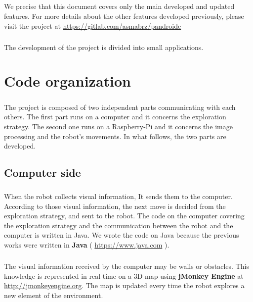 \documentclass[12pt]{report}
\begin{document}
\paragraph{}
We precise that this document covers only the main developed and updated features. For more details about the other features developed previously, please visit the project at \url{https://gitlab.com/asmabrz/pandroide}

\paragraph{}
The development of the project is divided into small applications. 


\chapter{Code organization}
\paragraph{}
The project is composed of two independent parts communicating with each others. The first part runs on a computer and it concerns the exploration strategy. The second one runs on a Raspberry-Pi and it concerns the image processing and the robot's movements. In what follows, the two parts are developed.
\section{Computer side}
\paragraph{}
When the robot collects visual information, It sends them to the computer. According to those visual information, the next move is decided from the exploration strategy, and sent to the robot. The code on the computer covering the exploration strategy and the communication between the robot and the computer is written in Java. We wrote the code on Java because the previous works were written in \textbf{Java} ( \url{https://www.java.com} ).
\paragraph{}
The visual information received by the computer may be walls or obstacles. This knowledge is represented in real time on a 3D map using \textbf{jMonkey Engine} at \url{http://jmonkeyengine.org}. The map is updated every time the robot explores a new element of the environment.
\end{document}
